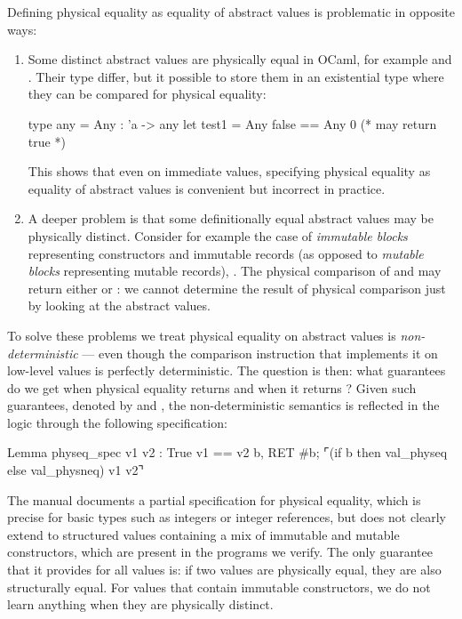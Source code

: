 Defining physical equality as \Rocq equality of abstract values is problematic in opposite ways:
\begin{enumerate}
\item Some distinct abstract values are physically equal in OCaml, for example  and . Their type differ, but it possible to store them in an existential type where they can be compared for physical equality:
\begin{ocamlcode}
type any = Any : 'a -> any
let test1 = Any false == Any 0 (* may return true *)
\end{ocamlcode}
This shows that even on immediate values, specifying physical equality as equality of abstract values is convenient but incorrect in practice.

\item A deeper problem is that some definitionally equal abstract values may be physically distinct.
  Consider for example the case of \emph{immutable blocks} representing constructors and immutable records (as opposed to \emph{mutable blocks} representing mutable records), \eg {}.
  The physical comparison of  and  may return either  or : we cannot determine the result of physical comparison just by looking at the abstract values.
\end{enumerate}

To solve these problems we treat physical equality on abstract values is \emph{non-deterministic} --- even though the comparison instruction that implements it on low-level values is perfectly deterministic.
The question is then: what guarantees do we get when physical equality returns  and when it returns ?
Given such guarantees, denoted by  and , the non-deterministic semantics is reflected in the logic through the following specification:

\begin{coqcode}
Lemma physeq_spec v1 v2 :
  {{{ True }}}
    v1 == v2
  {{{ b, RET #b; ⌜(if b then val_physeq else val_physneq) v1 v2⌝ }}}
\end{coqcode}

 The \OCaml manual documents a partial specification for physical equality, which is precise for basic types such as integers or integer references, but does not clearly extend to structured values containing a mix of immutable and mutable constructors, which are present in the programs we verify.
The only guarantee that it provides for all values is: if two values are physically equal, they are also structurally equal. For values that contain immutable constructors, we do not learn anything when they are physically distinct.

